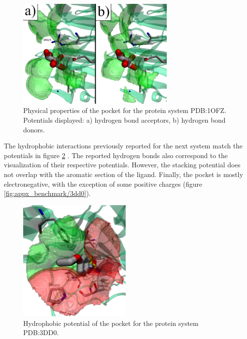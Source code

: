     \begin{figure}[H]
      \centering
      \includegraphics[width=0.7\textwidth]{figures/results/benchmark_prot/1ofz.png}
      \caption{\label{fig:benchmark/1ofz} Physical properties of the pocket for the protein system PDB:1OFZ. Potentials displayed: a) hydrogen bond acceptors, b) hydrogen bond donors.}
    \end{figure}

    The hydrophobic interactions previously reported for the next system match the potentials in figure \ref{fig:benchmark/3dd0} \cite{benchmark_strong_2021}. The reported hydrogen bonds also correspond to the visualization of their respective potentials. However, the stacking potential does not overlap with the aromatic section of the ligand. Finally, the pocket is mostly electronegative, with the exception of some positive charges (figure \ref{fig:appx_benchmark/3dd0}).

    \begin{figure}[H]
      \centering
      \includegraphics[width=0.5\textwidth]{figures/results/benchmark_prot/3dd0.png}
      \caption{\label{fig:benchmark/3dd0} Hydrophobic potential of the pocket for the protein system PDB:3DD0.}
    \end{figure}

